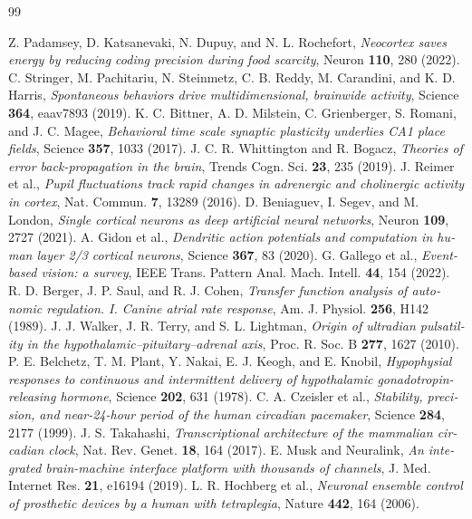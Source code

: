 \begin{thebibliography}{99}
\begin{otherlanguage}{english}
 Z. Padamsey, D. Katsanevaki, N. Dupuy, and N. L. Rochefort, \emph{Neocortex saves energy by reducing coding precision during food scarcity}, Neuron \textbf{110}, 280 (2022).
 C. Stringer, M. Pachitariu, N. Steinmetz, C. B. Reddy, M. Carandini, and K. D. Harris, \emph{Spontaneous behaviors drive multidimensional, brainwide activity}, Science \textbf{364}, eaav7893 (2019).
 K. C. Bittner, A. D. Milstein, C. Grienberger, S. Romani, and J. C. Magee, \emph{Behavioral time scale synaptic plasticity underlies CA1 place fields}, Science \textbf{357}, 1033 (2017).
 J. C. R. Whittington and R. Bogacz, \emph{Theories of error back-propagation in the brain}, Trends Cogn. Sci. \textbf{23}, 235 (2019).
 J. Reimer et al., \emph{Pupil fluctuations track rapid changes in adrenergic and cholinergic activity in cortex}, Nat. Commun. \textbf{7}, 13289 (2016).
 D. Beniaguev, I. Segev, and M. London, \emph{Single cortical neurons as deep artificial neural networks}, Neuron \textbf{109}, 2727 (2021).
 A. Gidon et al., \emph{Dendritic action potentials and computation in human layer 2/3 cortical neurons}, Science \textbf{367}, 83 (2020).
 G. Gallego et al., \emph{Event-based vision: a survey}, IEEE Trans. Pattern Anal. Mach. Intell. \textbf{44}, 154 (2022).
 R. D. Berger, J. P. Saul, and R. J. Cohen, \emph{Transfer function analysis of autonomic regulation. I. Canine atrial rate response}, Am. J. Physiol. \textbf{256}, H142 (1989).
 J. J. Walker, J. R. Terry, and S. L. Lightman, \emph{Origin of ultradian pulsatility in the hypothalamic--pituitary--adrenal axis}, Proc. R. Soc. B \textbf{277}, 1627 (2010).
 P. E. Belchetz, T. M. Plant, Y. Nakai, E. J. Keogh, and E. Knobil, \emph{Hypophysial responses to continuous and intermittent delivery of hypothalamic gonadotropin-releasing hormone}, Science \textbf{202}, 631 (1978).
 C. A. Czeisler et al., \emph{Stability, precision, and near-24-hour period of the human circadian pacemaker}, Science \textbf{284}, 2177 (1999).
 J. S. Takahashi, \emph{Transcriptional architecture of the mammalian circadian clock}, Nat. Rev. Genet. \textbf{18}, 164 (2017).
 E. Musk and Neuralink, \emph{An integrated brain-machine interface platform with thousands of channels}, J. Med. Internet Res. \textbf{21}, e16194 (2019).
 L. R. Hochberg et al., \emph{Neuronal ensemble control of prosthetic devices by a human with tetraplegia}, Nature \textbf{442}, 164 (2006).

\end{otherlanguage}
\end{thebibliography}
